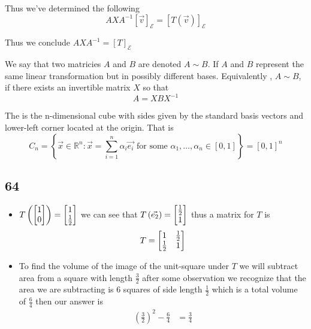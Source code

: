 \documentclass[11pt]{book}
\begin{document}
Thus we've determined the following
\begin{equation*}
    AXA^{-1} \left[ \vec{v}  \right]_{\mathcal{E}} = \left[ T\left(\vec{v} \right) \right]_{\mathcal{E}}        
\end{equation*}

Thus we conclude $AXA^{-1} = \left[ T \right]_{\mathcal{E}} $ 

\begin{defn}\label{defn:similar_matricies}
    We say that two matricies $A$ and $B$ are  denoted $A \sim B$. If $A$ and $B$ represent the same linear transformation but in possibly different bases. Equivalently , $A \sim B $, if there exists an invertible matrix $X$ so that 
    \[
    A= XBX^{-1} 
    \]
\end{defn}

\begin{defn}\label{defn:unit_n_cube}
    The  is the n-dimensional cube with sides given by the standard basis vectors and lower-left corner located at the origin. That is 
    \[
        C_{n} = \left\{ \vec{x} \in \mathbb{R} ^{n} : \vec{x} = \sum_{i=1}^{n} \alpha _{i} \vec{e_{i} } \text{ for some  } \alpha_1, \ldots, \alpha_{n} \in \left[ 0,1 \right]   \right\} = \left[ 0,1 \right] ^{n} 
    \]
\end{defn}

\subsection{64}%
\label{sub:64}

\begin{itemize}
    \item $T\left(\begin{bmatrix} 1 \\ 0 \end{bmatrix} \right)= \begin{bmatrix} 1 \\ \frac{1}{2} \end{bmatrix} $ we can see that $T\left(\vec{e_2} \right) = \begin{bmatrix} \frac{1}{2} \\ 1 \end{bmatrix} $ thus a matrix for $T$ is
        \[
        T = \begin{bmatrix} 1 & \frac{1}{2} \\ \frac{1}{2} & 1 \end{bmatrix}
        \]
    \item To find the volume of the image of the unit-square under $T$ we will subtract area from a square with length $\frac{3}{2}$ after some observation we recognize that the area we are subtracting is 6 squares of side length $\frac{1}{2}$ which is a total volume of $\frac{6}{4}$ then our answer is 
        \begin{align*}
            \left( \frac{3}{2} \right) ^2  - \frac{6}{4} &= \frac{3}{4} \\ 
        \end{align*}
\end{itemize}
\end{document}
